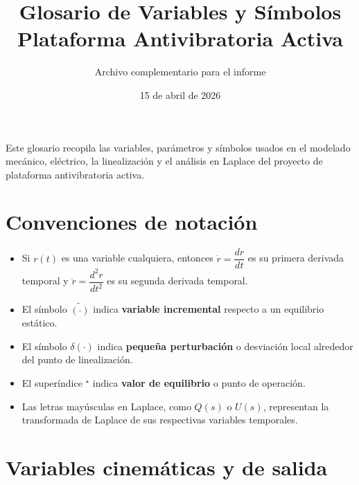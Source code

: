 \documentclass[11pt]{article}
\title{Glosario de Variables y S\'imbolos\\Plataforma Antivibratoria Activa}
\author{Archivo complementario para el informe}
\date{15 de abril de 2026}
\begin{document}
\maketitle

Este glosario recopila las variables, par\'ametros y s\'imbolos usados en el modelado mec\'anico, el\'ectrico, la linealizaci\'on y el an\'alisis en Laplace del proyecto de plataforma antivibratoria activa.

\section{Convenciones de notaci\'on}

\begin{itemize}[leftmargin=1.2cm]
\item Si $r(t)$ es una variable cualquiera, entonces $\dot r = \dfrac{dr}{dt}$ es su primera derivada temporal y $\ddot r = \dfrac{d^2r}{dt^2}$ es su segunda derivada temporal.
\item El s\'imbolo $\tilde{(\cdot)}$ indica \textbf{variable incremental} respecto a un equilibrio est\'atico.
\item El s\'imbolo $\delta(\cdot)$ indica \textbf{peque\~na perturbaci\'on} o desviaci\'on local alrededor del punto de linealizaci\'on.
\item El super\'indice ${}^\star$ indica \textbf{valor de equilibrio} o punto de operaci\'on.
\item Las letras may\'usculas en Laplace, como $Q(s)$ o $U(s)$, representan la transformada de Laplace de sus respectivas variables temporales.
\end{itemize}

\renewcommand{\arraystretch}{1.2}

\section{Variables cinem\'aticas y de salida}
\end{document}
